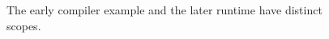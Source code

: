 \begin{figure}[H]
\centering
{}
\caption{The early compiler example and the later runtime have distinct scopes.}\label{fig:teach-P-03d-java-delivery-01}
\end{figure}
